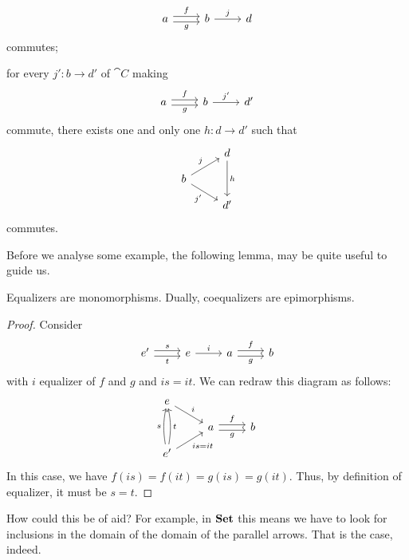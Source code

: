 \begin{definition}
\begin{tcbitem}
\[\begin{tikzcd}
        a \ar["f", r, shift left] \ar["g", r, shift right, swap] & b
        \ar["j", r] & d
      \end{tikzcd}\] commutes;
  \item for every \(j' : b \to d'\) of \(\cat C\) making
    \[\begin{tikzcd}
        a \ar["f", r, shift left] \ar["g", r, shift right, swap] & b
        \ar["{j'}", r] & d'
      \end{tikzcd}\] commute, there exists one and only one
    \(h : d \to d'\) such that
    \[\begin{tikzcd}[row sep=small]
        & d \ar["h", dd] \\
        b \ar["j", ur] \ar["{j'}", dr, swap] \\
        & d'
      \end{tikzcd}\] commutes.
  \end{tcbitem}
\end{definition}

Before we analyse some example, the following lemma, may be quite
useful to guide us.

\begin{lemma}\label{lemma:EqualizersAreMonos}
  Equalizers are monomorphisms. Dually, coequalizers are epimorphisms.
\end{lemma}

\begin{proof}
  Consider
  \[\begin{tikzcd}
      e' \ar["s", r, shift left] \ar["t", r, shift right, swap] & e
      \ar["i", r] & a \ar["f", r, shift left] \ar["g", r, shift right,
      swap] & b
    \end{tikzcd}\] with \(i\) equalizer of \(f\) and \(g\) and
  \(is = it\). We can redraw this diagram as follows:
  \[\begin{tikzcd}[row sep=small]
      e \ar["i", dr] \\
      & a \ar["f", r, shift left] \ar["g", r, shift right, swap] & b \\
      e' \ar["s", uu, bend left=10] \ar["t", uu, bend right=10, swap]
      \ar["{is = it}", ur, swap]
    \end{tikzcd}\] In this case, we have
  \(f(is) = f(it) = g(is) = g(it)\). Thus, by definition of equalizer,
  it must be \(s = t\).
\end{proof}

How could this be of aid? For example, in \(\mathbf{Set}\) this means we have
to look for inclusions in the domain of the domain of the parallel
arrows. That is the case, indeed.

